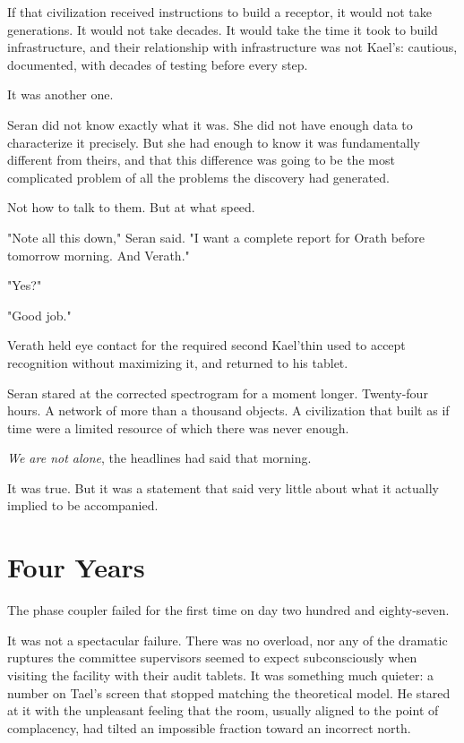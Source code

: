 \documentclass[11pt,a5paper,twoside]{book}
\begin{document}
If that civilization received instructions to build a receptor, it would not take generations. It would not take decades. It would take the time it took to build infrastructure, and their relationship with infrastructure was not Kael’s: cautious, documented, with decades of testing before every step.

It was another one.

Seran did not know exactly what it was. She did not have enough data to characterize it precisely. But she had enough to know it was fundamentally different from theirs, and that this difference was going to be the most complicated problem of all the problems the discovery had generated.

Not how to talk to them. But at what speed.

"Note all this down," Seran said. "I want a complete report for Orath before tomorrow morning. And Verath."

"Yes?"

"Good job."

Verath held eye contact for the required second Kael'thin used to accept recognition without maximizing it, and returned to his tablet.

Seran stared at the corrected spectrogram for a moment longer. Twenty-four hours. A network of more than a thousand objects. A civilization that built as if time were a limited resource of which there was never enough.

\textit{We are not alone}, the headlines had said that morning.

It was true. But it was a statement that said very little about what it actually implied to be accompanied.

\chapter{Four Years}

The phase coupler failed for the first time on day two hundred and eighty-seven.

It was not a spectacular failure. There was no overload, nor any of the dramatic ruptures the committee supervisors seemed to expect subconsciously when visiting the facility with their audit tablets. It was something much quieter: a number on Tael's screen that stopped matching the theoretical model. He stared at it with the unpleasant feeling that the room, usually aligned to the point of complacency, had tilted an impossible fraction toward an incorrect north.
\end{document}
